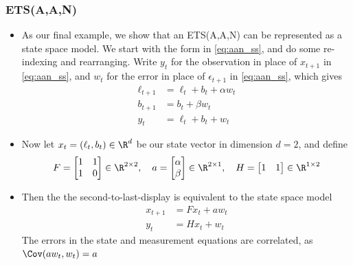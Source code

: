 \documentclass{article}
\begin{document}
\subsubsection{ETS(A,A,N)}

\begin{itemize}
\item As our final example, we show that an ETS(A,A,N) can be represented as a 
  state space model. We start with the form in \eqref{eq:aan_ss}, and do some
  re-indexing and rearranging. Write $y_t$ for the observation in place of
  $x_{t+1}$ in \eqref{eq:aan_ss}, and $w_t$ for the error in place of
  $\epsilon_{t+1}$ in \eqref{eq:aan_ss}, which gives 
  \begin{align*}
  \ell_{t+1} &= \ell_t + b_t + \alpha w_t \\
  b_{t+1} &= b_t + \beta w_t \\
  y_t &= \ell_t + b_t + w_t 
  \end{align*}

\item Now let $x_t = (\ell_t, b_t) \in \R^d$ be our state vector in dimension
  $d=2$, and define 
  \[
  F = 
    \begin{bmatrix} 
    1 & 1 \\ 1 & 0 
    \end{bmatrix} \in \R^{2 \times 2}, \quad 
  a = 
    \begin{bmatrix} 
    \alpha \\ \beta 
    \end{bmatrix} \in \R^{2 \times 1}, \quad
  H =
    \begin{bmatrix} 
    1 & 1
    \end{bmatrix} \in \R^{1 \times 2}
  \]

\item Then the the second-to-last-display is equivalent to the state space model 
  \begin{align*}
  x_{t+1} &= F x_t + a w_t \\
  y_t &= H x_t + w_t
  \end{align*}  
  The errors in the state and measurement equations are correlated, as $\Cov(a
  w_t, w_t) = a$     
\end{itemize}
\end{document}
